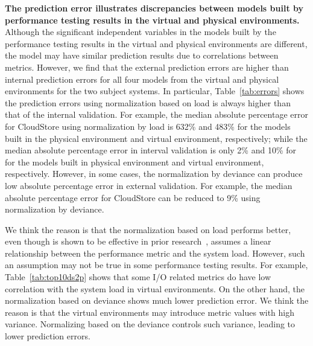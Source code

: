 \noindent \textbf{The prediction error illustrates discrepancies between models built by performance testing results in the virtual and physical environments.} Although the significant independent variables in the models built by the performance testing results in the virtual and physical environments are different, the model may have similar prediction results due to correlations between metrics. However, we find that the external prediction errors are higher than internal prediction errors for all four models from the virtual and physical environments for the two subject systems. In particular, Table~\ref{tab:errors} shows the prediction errors using normalization based on load is always higher than that of the internal validation. For example, the median absolute percentage error for CloudStore using normalization by load is 632\% and 483\% for the models built in the physical environment and virtual environment, respectively; while the median absolute percentage error in interval validation is only 2\% and 10\% for for the models built in physical environment and virtual environment, respectively. However, in some cases, the normalization by deviance can produce low absolute percentage error in external validation. For example, the median absolute percentage error for CloudStore can be reduced to 9\% using normalization by deviance. 

We think the reason is that the normalization based on load performs better, even though is shown to be effective in prior research~\cite{Nguyen:2012:ADP:2188286.2188344}, assumes a linear relationship between the performance metric and the system load. However, such an assumption may not be true in some performance testing results. For example, Table~\ref{tab:top10ds2p} shows that some I/O related metrics do have low correlation with the system load in virtual environments. On the other hand, the normalization based on deviance shows much lower prediction error. We think the reason is that the virtual environments may introduce metric values with high variance. Normalizing based on the deviance controls such variance, leading to lower prediction errors.



